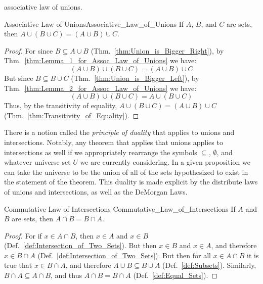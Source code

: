         associative law of unions.
        \begin{ltheorem}{Associative Law of Unions}{Associative_Law_of_Unions}
            If $A$, $B$, and $C$ are sets, then
            $A\cup(B\cup{C})=(A\cup{B})\cup{C}$.
        \end{ltheorem}
        \begin{proof}
            For since $B\subseteq{A}\cup{B}$
            (Thm.~\ref{thm:Union_is_Bigger_Right}), by
            Thm.~\ref{thm:Lemma_1_for_Assoc_Law_of_Unions} we have:
            \begin{equation}
                (A\cup{B})\cup(B\cup{C})=(A\cup{B})\cup{C}
            \end{equation}
            But since $B\subseteq{B}\cup{C}$
            (Thm.~\ref{thm:Union_is_Bigger_Left}),
            by Thm.~\ref{thm:Lemma_2_for_Assoc_Law_of_Unions} we have:
            \begin{equation}
                (A\cup{B})\cup(B\cup{C})=A\cup(B\cup{C})
            \end{equation}
            Thus, by the transitivity of equality,
            $A\cup(B\cup{C})=(A\cup{B})\cup{C}$
            (Thm.~\ref{thm:Transitivity_of_Equality}).
        \end{proof}
        There is a notion called the \textit{principle of duality}%
         that applies to unions and intersections.
        Notably, any theorem that applies that unions applies to intersections
        as well if we appropriately rearrange the symbols $\subseteq$,
        $\emptyset$, and whatever universe set $U$ we are currently considering.
        In a given proposition we can take the universe to be the union of all
        of the sets hypothesized to exist in the statement of the theorem. This
        duality is made explicit by the distribute laws of unions and
        intersections, as well as the DeMorgan Laws.
        \begin{ltheorem}{Commutative Law of Intersections}
                        {Commutative_Law_of_Intersections}
            If $A$ and $B$ are sets, then $A\cap{B}=B\cap{A}$.
        \end{ltheorem}
        \begin{proof}
            For if $x\in{A}\cap{B}$, then $x\in{A}$ and $x\in{B}$
            (Def.~\ref{def:Intersection_of_Two_Sets}). But then $x\in{B}$ and
            $x\in{A}$, and therefore $x\in{B}\cap{A}$
            (Def.~\ref{def:Intersection_of_Two_Sets}). But then for all
            $x\in{A}\cap{B}$ it is true that $x\in{B}\cap{A}$, and therefore
            $A\cup{B}\subseteq{B}\cup{A}$ (Def.~\ref{def:Subsets}). Similarly,
            $B\cap{A}\subseteq{A}\cap{B}$, and thus $A\cap{B}=B\cap{A}$
            (Def.~\ref{def:Equal_Sets}).
        \end{proof}
